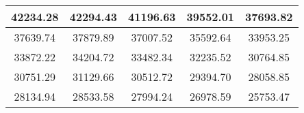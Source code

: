 \begin{large}\begin{tabular}{|c|c|c|c|c|}
\hline
42234.28&42294.43&41196.63&39552.01&37693.82\\\hline
37639.74&37879.89&37007.52&35592.64&33953.25\\\hline
33872.22&34204.72&33482.34&32235.52&30764.85\\\hline
30751.29&31129.66&30512.72&29394.70&28058.85\\\hline
28134.94&28533.58&27994.24&26978.59&25753.47\\\hline
\end{tabular}
\end{large}